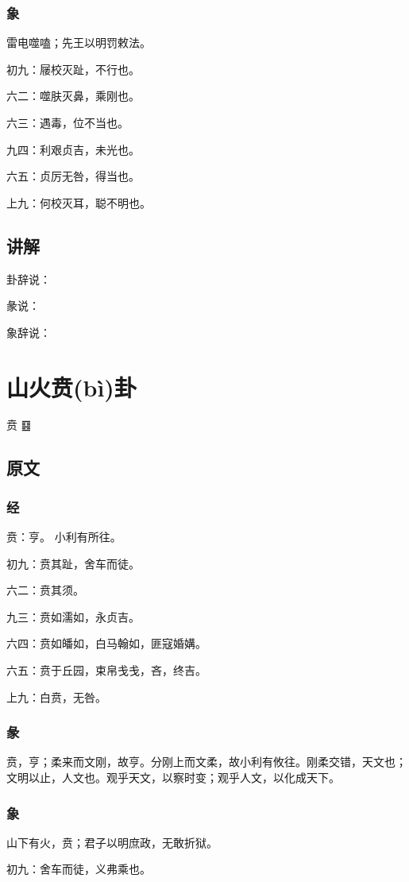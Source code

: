 \documentclass[12pt,oneside]{book}
\begin{document}
\subsection{象}
雷电噬嗑；先王以明罚敕法。

初九：屦校灭趾，不行也。

六二：噬肤灭鼻，乘刚也。

六三：遇毒，位不当也。

九四：利艰贞吉，未光也。

六五：贞厉无咎，得当也。

上九：何校灭耳，聪不明也。

\section{讲解}
卦辞说：

彖说：

象辞说：

\chapter{山火贲(bì)卦}
贲 {\Large ䷕}

\section{原文}
\subsection{经}
贲：亨。 小利有所往。

初九：贲其趾，舍车而徒。

六二：贲其须。

九三：贲如濡如，永贞吉。

六四：贲如皤如，白马翰如，匪寇婚媾。

六五：贲于丘园，束帛戋戋，吝，终吉。

上九：白贲，无咎。

\subsection{彖}
贲，亨；柔来而文刚，故亨。分刚上而文柔，故小利有攸往。刚柔交错，天文也；文明以止，人文也。观乎天文，以察时变；观乎人文，以化成天下。
\subsection{象}
山下有火，贲；君子以明庶政，无敢折狱。

初九：舍车而徒，义弗乘也。
\end{document}

